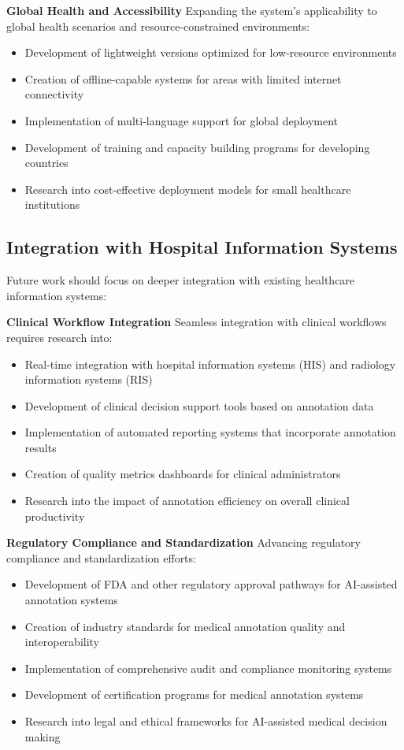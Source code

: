 \textbf{Global Health and Accessibility}
Expanding the system's applicability to global health scenarios and resource-constrained environments:

\begin{itemize}
    \item Development of lightweight versions optimized for low-resource environments
    \item Creation of offline-capable systems for areas with limited internet connectivity
    \item Implementation of multi-language support for global deployment
    \item Development of training and capacity building programs for developing countries
    \item Research into cost-effective deployment models for small healthcare institutions
\end{itemize}

\subsection{Integration with Hospital Information Systems}

Future work should focus on deeper integration with existing healthcare information systems:

\textbf{Clinical Workflow Integration}
Seamless integration with clinical workflows requires research into:

\begin{itemize}
    \item Real-time integration with hospital information systems (HIS) and radiology information systems (RIS)
    \item Development of clinical decision support tools based on annotation data
    \item Implementation of automated reporting systems that incorporate annotation results
    \item Creation of quality metrics dashboards for clinical administrators
    \item Research into the impact of annotation efficiency on overall clinical productivity
\end{itemize}

\textbf{Regulatory Compliance and Standardization}
Advancing regulatory compliance and standardization efforts:

\begin{itemize}
    \item Development of FDA and other regulatory approval pathways for AI-assisted annotation systems
    \item Creation of industry standards for medical annotation quality and interoperability
    \item Implementation of comprehensive audit and compliance monitoring systems
    \item Development of certification programs for medical annotation systems
    \item Research into legal and ethical frameworks for AI-assisted medical decision making
\end{itemize}

